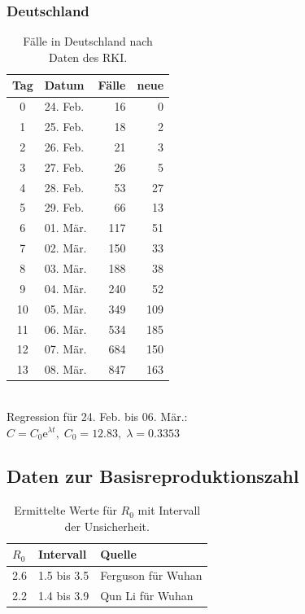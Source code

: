 \documentclass[a4paper,11pt,fleqn,twocolumn,twoside,dvipdfmx]{scrartcl}
\numberwithin{equation}{section}
\newcommand{\ee}{\mathrm e}
\newcommand{\strong}[1]{\textbf{#1}}
\begin{document}
\subsubsection*{Deutschland}
\begin{table}[h]
\caption{Fälle in Deutschland\newline
nach Daten des RKI.}
\begin{tabular}{clrr}
\toprule
\strong{Tag} & \strong{Datum} & \strong{Fälle} & \strong{neue}\\
\midrule
0 & 24. Feb. & 16 & 0\\
1 & 25. Feb. & 18 & 2\\
2 & 26. Feb. & 21 & 3\\
3 & 27. Feb. & 26 & 5\\
4 & 28. Feb. & 53 & 27\\
5 & 29. Feb. & 66 & 13\\
6 & 01. Mär. & 117 & 51\\
7 & 02. Mär. & 150 & 33\\
8 & 03. Mär. & 188 & 38\\
9 & 04. Mär. & 240 & 52\\
10 & 05. Mär. & 349 & 109\\
11 & 06. Mär. & 534 & 185\\
12 & 07. Mär. & 684 & 150\\
13 & 08. Mär. & 847 & 163\\
\bottomrule
\end{tabular}\\[6pt]
Regression für 24. Feb. bis 06. Mär.:\\
$C = C_0\ee^{\lambda t},\; C_0=12.83,\; \lambda=0.3353$
\end{table}

\newpage
\subsection{Daten zur Basisreproduktionszahl}
\begin{table}[h]
\caption{Ermittelte Werte für $R_0$ mit\newline
Intervall der Unsicherheit.}
\begin{tabular}{lll}
\toprule
$R_0$ & Intervall & Quelle\\
\midrule
2.6 & 1.5 bis 3.5 & Ferguson für Wuhan \cite{Ferguson}\\
2.2 & 1.4 bis 3.9 & Qun Li für Wuhan \cite{QunLi}\\
\bottomrule
\end{tabular}
\end{table}
\end{document}
